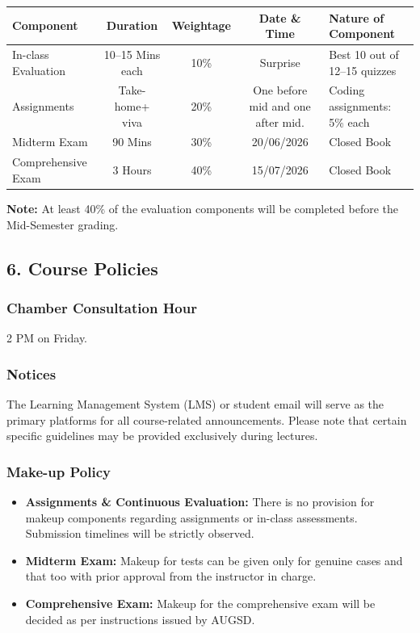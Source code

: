\documentclass[
]{article}
\providecommand{\tightlist}{%
  \setlength{\itemsep}{0pt}\setlength{\parskip}{0pt}}
\begin{document}
\begin{tabularx}{\textwidth}{X c c c X}
    \toprule
    \textbf{Component} & \textbf{Duration} & \textbf{Weightage} & \textbf{Date \& Time} & \textbf{Nature of Component} \\
    \midrule
    In-class Evaluation & 10--15 Mins each & 10\% & Surprise & Best 10 out of 12--15 quizzes \\
    \addlinespace
    2 Assignments & Take-home+ viva & 20\% & One before mid and one after mid. & Coding assignments: 5\% each \\
    \addlinespace
    Midterm Exam & 90 Mins & 30\% & 20/06/2026 & Closed Book \\
    \addlinespace
    Comprehensive Exam & 3 Hours & 40\% & 15/07/2026 & Closed Book \\
    \bottomrule
\end{tabularx}

\textbf{Note:} At least 40\% of the evaluation components will be
completed before the Mid-Semester grading.

\subsection{6. Course Policies}\label{course-policies}

\subsubsection{Chamber Consultation
Hour}\label{chamber-consultation-hour}

2 PM on Friday.

\subsubsection{Notices}\label{notices}

The Learning Management System (LMS) or student email will serve as the
primary platforms for all course-related announcements. Please note that
certain specific guidelines may be provided exclusively during lectures.

\subsubsection{Make-up Policy}\label{make-up-policy}

\begin{itemize}
\tightlist
\item
  \textbf{Assignments \& Continuous Evaluation:} There is no provision
  for makeup components regarding assignments or in-class assessments.
  Submission timelines will be strictly observed.\\
\item
  \textbf{Midterm Exam:} Makeup for tests can be given only for genuine
  cases and that too with prior approval from the instructor in
  charge.\\
\item
  \textbf{Comprehensive Exam:} Makeup for the comprehensive exam will be
  decided as per instructions issued by AUGSD.
\end{itemize}
\end{document}
